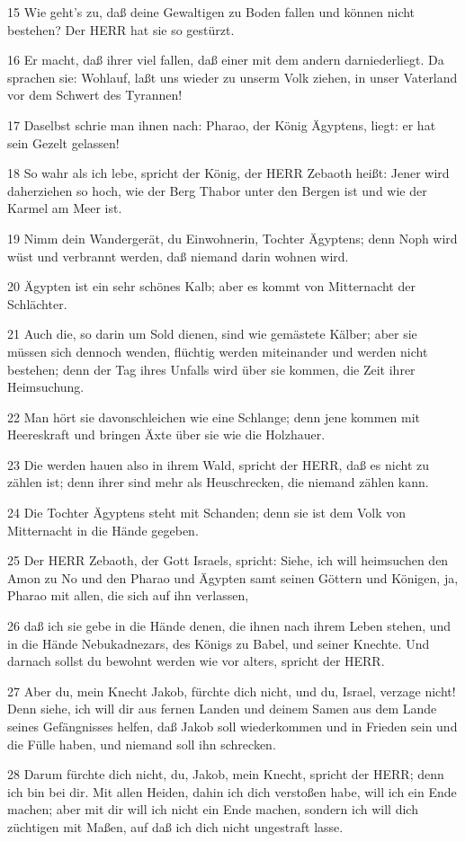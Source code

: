 \par 15 Wie geht's zu, daß deine Gewaltigen zu Boden fallen und können nicht bestehen? Der HERR hat sie so gestürzt.
\par 16 Er macht, daß ihrer viel fallen, daß einer mit dem andern darniederliegt. Da sprachen sie: Wohlauf, laßt uns wieder zu unserm Volk ziehen, in unser Vaterland vor dem Schwert des Tyrannen!
\par 17 Daselbst schrie man ihnen nach: Pharao, der König Ägyptens, liegt: er hat sein Gezelt gelassen!
\par 18 So wahr als ich lebe, spricht der König, der HERR Zebaoth heißt: Jener wird daherziehen so hoch, wie der Berg Thabor unter den Bergen ist und wie der Karmel am Meer ist.
\par 19 Nimm dein Wandergerät, du Einwohnerin, Tochter Ägyptens; denn Noph wird wüst und verbrannt werden, daß niemand darin wohnen wird.
\par 20 Ägypten ist ein sehr schönes Kalb; aber es kommt von Mitternacht der Schlächter.
\par 21 Auch die, so darin um Sold dienen, sind wie gemästete Kälber; aber sie müssen sich dennoch wenden, flüchtig werden miteinander und werden nicht bestehen; denn der Tag ihres Unfalls wird über sie kommen, die Zeit ihrer Heimsuchung.
\par 22 Man hört sie davonschleichen wie eine Schlange; denn jene kommen mit Heereskraft und bringen Äxte über sie wie die Holzhauer.
\par 23 Die werden hauen also in ihrem Wald, spricht der HERR, daß es nicht zu zählen ist; denn ihrer sind mehr als Heuschrecken, die niemand zählen kann.
\par 24 Die Tochter Ägyptens steht mit Schanden; denn sie ist dem Volk von Mitternacht in die Hände gegeben.
\par 25 Der HERR Zebaoth, der Gott Israels, spricht: Siehe, ich will heimsuchen den Amon zu No und den Pharao und Ägypten samt seinen Göttern und Königen, ja, Pharao mit allen, die sich auf ihn verlassen,
\par 26 daß ich sie gebe in die Hände denen, die ihnen nach ihrem Leben stehen, und in die Hände Nebukadnezars, des Königs zu Babel, und seiner Knechte. Und darnach sollst du bewohnt werden wie vor alters, spricht der HERR.
\par 27 Aber du, mein Knecht Jakob, fürchte dich nicht, und du, Israel, verzage nicht! Denn siehe, ich will dir aus fernen Landen und deinem Samen aus dem Lande seines Gefängnisses helfen, daß Jakob soll wiederkommen und in Frieden sein und die Fülle haben, und niemand soll ihn schrecken.
\par 28 Darum fürchte dich nicht, du, Jakob, mein Knecht, spricht der HERR; denn ich bin bei dir. Mit allen Heiden, dahin ich dich verstoßen habe, will ich ein Ende machen; aber mit dir will ich nicht ein Ende machen, sondern ich will dich züchtigen mit Maßen, auf daß ich dich nicht ungestraft lasse.

